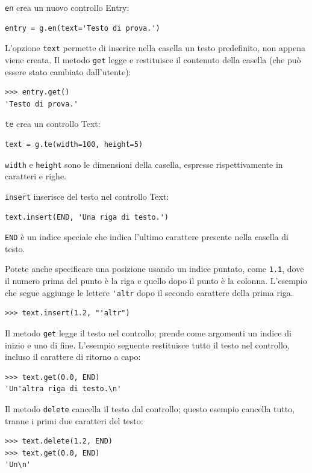 \documentclass[10pt]{book}
\begin{document}
{\tt en} crea un nuovo controllo Entry:

\begin{verbatim}
entry = g.en(text='Testo di prova.')
\end{verbatim}
%
L'opzione {\tt text} permette di inserire nella casella un testo predefinito,  non appena viene creata.
Il metodo {\tt get} legge e restituisce il contenuto della casella (che può essere stato cambiato dall'utente):

\begin{verbatim}
>>> entry.get()
'Testo di prova.'
\end{verbatim}
%
{\tt te} crea un controllo Text:

\begin{verbatim}
text = g.te(width=100, height=5)
\end{verbatim}
%
{\tt width} e {\tt height} sono le dimensioni della casella, espresse rispettivamente in caratteri e righe.

{\tt insert} inserisce del testo nel controllo Text:

\begin{verbatim}
text.insert(END, 'Una riga di testo.')
\end{verbatim}
%
{\tt END} è un indice speciale che indica l'ultimo carattere presente nella casella di testo.

Potete anche specificare una posizione usando un indice puntato, come {\tt 1.1},
dove il numero prima del punto è la riga e quello dopo il punto è la colonna. L'esempio che segue aggiunge le lettere \verb"'altr" dopo il secondo carattere della prima riga.

\begin{verbatim}
>>> text.insert(1.2, "'altr")
\end{verbatim}
%
Il metodo {\tt get} legge il testo nel controllo; prende come argomenti un indice di inizio e uno di fine. L'esempio seguente restituisce tutto il testo nel controllo, incluso il carattere di ritorno a capo:

\begin{verbatim}
>>> text.get(0.0, END)
'Un'altra riga di testo.\n'
\end{verbatim}
%
Il metodo {\tt delete} cancella il testo dal controllo; questo esempio cancella tutto, tranne i primi due caratteri del testo:

\begin{verbatim}
>>> text.delete(1.2, END)
>>> text.get(0.0, END)
'Un\n'
\end{verbatim}
%
\end{document}
